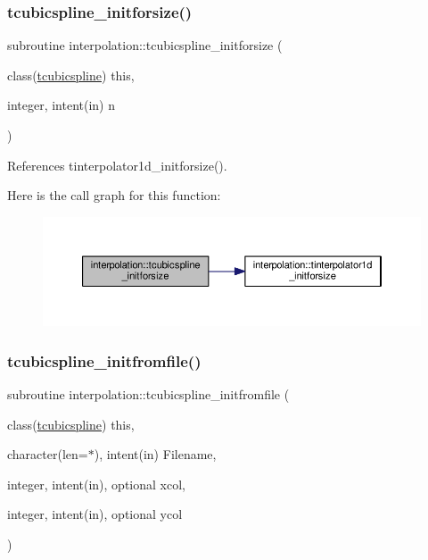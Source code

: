 \subsubsection{\texorpdfstring{tcubicspline\+\_\+initforsize()}{tcubicspline\_initforsize()}}
{\footnotesize\ttfamily subroutine interpolation\+::tcubicspline\+\_\+initforsize (\begin{DoxyParamCaption}\item[{class(\mbox{\hyperlink{structinterpolation_1_1tcubicspline}{tcubicspline}})}]{this,  }\item[{integer, intent(in)}]{n }\end{DoxyParamCaption})}



References tinterpolator1d\+\_\+initforsize().

Here is the call graph for this function\+:
\nopagebreak
\begin{figure}[H]
\begin{center}
\leavevmode
\includegraphics[width=350pt]{namespaceinterpolation_a7f58be276bbe7b10b95a7e156a4bc0b8_cgraph}
\end{center}
\end{figure}
\mbox{\label{namespaceinterpolation_a89e495ca87c6f696d6aac646fd227f03}} 
\subsubsection{\texorpdfstring{tcubicspline\+\_\+initfromfile()}{tcubicspline\_initfromfile()}}
{\footnotesize\ttfamily subroutine interpolation\+::tcubicspline\+\_\+initfromfile (\begin{DoxyParamCaption}\item[{class(\mbox{\hyperlink{structinterpolation_1_1tcubicspline}{tcubicspline}})}]{this,  }\item[{character(len=$\ast$), intent(in)}]{Filename,  }\item[{integer, intent(in), optional}]{xcol,  }\item[{integer, intent(in), optional}]{ycol }\end{DoxyParamCaption})}


